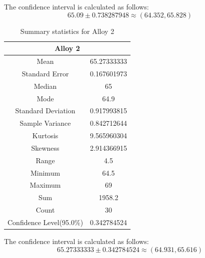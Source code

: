 \documentclass[letterpaper]{article}
\begin{document}
The confidence interval is calculated as follows:
$$65.09 \pm 0.738287948 \approx (64.352, 65.828)$$

\begin{table}[H]
 \centering
 \begin{tabular}{|c|c|}
  \hline  \multicolumn{2}{|c|}{Alloy 2}  \\ \hline
  Mean                     & 65.27333333 \\ \hline
  Standard Error           & 0.167601973 \\ \hline
  Median                   & 65          \\ \hline
  Mode                     & 64.9        \\ \hline
  Standard Deviation       & 0.917993815 \\ \hline
  Sample Variance          & 0.842712644 \\ \hline
  Kurtosis                 & 9.565960304 \\ \hline
  Skewness                 & 2.914366915 \\ \hline
  Range                    & 4.5         \\ \hline
  Minimum                  & 64.5        \\ \hline
  Maximum                  & 69          \\ \hline
  Sum                      & 1958.2      \\ \hline
  Count                    & 30          \\ \hline
  Confidence Level(95.0\%) & 0.342784524 \\ \hline
 \end{tabular}
 \caption{Summary statistics for Alloy 2}
 \label{3a2}
\end{table}

The confidence interval is calculated as follows:
$$65.27333333 \pm 0.342784524 \approx (64.931, 65.616)$$
\end{document}
